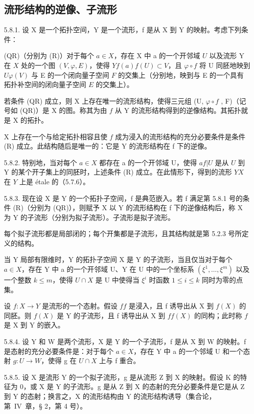 \subsection{流形结构的逆像、子流形}

5.8.1. 设 X 是一个拓扑空间，Y 是一个流形，f 是从 X 到 Y 的映射。考虑下列条件：

(QR)（分别为 (R)）对于每个 \(a \in X\)，存在 X 中 a 的一个开邻域 \(U\) 以及流形 Y 在 \(X\) 处的一个图 \((V, \varphi, E)\)，使得 \(Y\)\(f(a)\)\(f(U) \subset V\)，且 \(\varphi \circ f\) 将 U 同胚地映到 \(U\)\(\varphi(V)\) 与 E 的一个闭向量子空间 \(F\) 的交集上（分别地，映到与 E 的一个具有拓扑补空间的闭向量子空间 \(E\) 的交集上）。

若条件 (QR) 成立，则 X 上存在唯一的流形结构，使得三元组 (U, \(\varphi \circ f\) , F)（记号如 (QR)）是 X 的图。称其为由 \(f\) 从 Y 的流形结构得到的逆像结构。其拓扑就是 X 的拓扑。

X 上存在一个与给定拓扑相容且使 \(f\) 成为浸入的流形结构的充分必要条件是条件 (R) 成立。此结构随后是唯一的：它是 Y 的流形结构在 f 下的逆像。

5.8.2. 特别地，当对每个 \(a \in X\) 都存在 a 的一个开邻域 U，使得 \(a\)\(f|U\) 是从 \(U\) 到 Y 的某个开子集上的同胚时，上述条件 (R) 成立。在此情形下，得到的流形 \(Y\)\(X\) 在 \(Y\) 上是 étale 的（5.7.6）。

5.8.3. 现在设 X 是 Y 的一个拓扑子空间，f 是典范嵌入。若 f 满足第 5.8.1 号的条件 (R)（分别为 (QR)），则赋予 X 以 Y 的流形结构在 f 下的逆像结构后，称 X 为 Y 的子流形（分别为拟子流形）。子流形是拟子流形。

每个拟子流形都是局部闭的；每个开集都是子流形，且其结构就是第 5.2.3 号所定义的结构。

当 Y 局部有限维时，Y 的拓扑子空间 X 是 Y 的子流形，当且仅当对于每个 \(a \in X\)，存在 Y 中 a 的一个开邻域 U、Y 在 U 中的一个坐标系 \((\xi^{1}, \ldots, \xi^{m})\) 以及一个整数 \(k \leqslant m\)，使得 \(U \cap X\) 是 U 中使得当 \(\xi^{i}\) 时函数 \(1 \leqslant i \leqslant k\) 同时为零的点集。

设 \(f:X\to Y\) 是流形的一个态射。假设 \(f\)\(f\) 是浸入，且 f 诱导出从 X 到 \(f(X)\) 的同胚。则 \(f(X)\) 是 Y 的子流形，且 f 诱导出从 X 到 \(f\)\(f(X)\) 的同构；此时称 \(f\) 是 X 到 Y 的嵌入。

5.8.4. 设 Y 和 W 是两个流形，X 是 Y 的一个子流形，f 是从 X 到 W 的映射。f 是态射的充分必要条件是：对于每个 \(a \in X\)，存在 Y 中 a 的一个邻域 U 和一个态射 \(g : U \to W\)，使得 g 在 \(U \cap X\) 上与 f 重合。

5.8.5. 设 X 是流形 Y 的一个拟子流形，g 是从流形 Z 到 X 的映射。假设 K 的特征为 0，或 X 是 Y 的子流形。g 是从 Z 到 X 的态射的充分必要条件是它是从 Z 到 Y 的态射；换言之，X 的流形结构由 Y 的流形结构诱导（集合论，第~IV~章，§ 2，第 4 号）。

